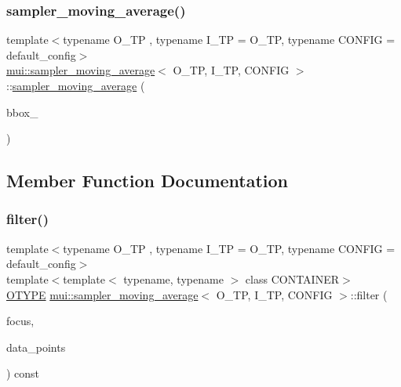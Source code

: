 \subsubsection{\texorpdfstring{sampler\+\_\+moving\+\_\+average()}{sampler\_moving\_average()}}
{\footnotesize\ttfamily template$<$typename O\+\_\+\+TP , typename I\+\_\+\+TP  = O\+\_\+\+TP, typename C\+O\+N\+F\+IG  = default\+\_\+config$>$ \\
\hyperlink{classmui_1_1sampler__moving__average}{mui\+::sampler\+\_\+moving\+\_\+average}$<$ O\+\_\+\+TP, I\+\_\+\+TP, C\+O\+N\+F\+IG $>$\+::\hyperlink{classmui_1_1sampler__moving__average}{sampler\+\_\+moving\+\_\+average} (\begin{DoxyParamCaption}\item[{\hyperlink{classmui_1_1sampler__moving__average_ae687f5cbf78af76e22bf97845f386300}{point\+\_\+type}}]{bbox\+\_\+ }\end{DoxyParamCaption})\hspace{0.3cm}{\ttfamily [inline]}}



\subsection{Member Function Documentation}
\mbox{\label{classmui_1_1sampler__moving__average_aaa0a6bd405aaa2566d08397aa436dfd2}} 
\subsubsection{\texorpdfstring{filter()}{filter()}}
{\footnotesize\ttfamily template$<$typename O\+\_\+\+TP , typename I\+\_\+\+TP  = O\+\_\+\+TP, typename C\+O\+N\+F\+IG  = default\+\_\+config$>$ \\
template$<$template$<$ typename, typename $>$ class C\+O\+N\+T\+A\+I\+N\+ER$>$ \\
\hyperlink{classmui_1_1sampler__moving__average_af5b1ae5cd60a907dbbd1f3fe978263dd}{O\+T\+Y\+PE} \hyperlink{classmui_1_1sampler__moving__average}{mui\+::sampler\+\_\+moving\+\_\+average}$<$ O\+\_\+\+TP, I\+\_\+\+TP, C\+O\+N\+F\+IG $>$\+::filter (\begin{DoxyParamCaption}\item[{\hyperlink{classmui_1_1sampler__moving__average_ae687f5cbf78af76e22bf97845f386300}{point\+\_\+type}}]{focus,  }\item[{const C\+O\+N\+T\+A\+I\+N\+ER$<$ \hyperlink{classmui_1_1sampler__moving__average_a93946e297f6a01f4aad6297d4dc55662}{I\+T\+Y\+PE}, C\+O\+N\+F\+IG $>$ \&}]{data\+\_\+points }\end{DoxyParamCaption}) const\hspace{0.3cm}{\ttfamily [inline]}}

